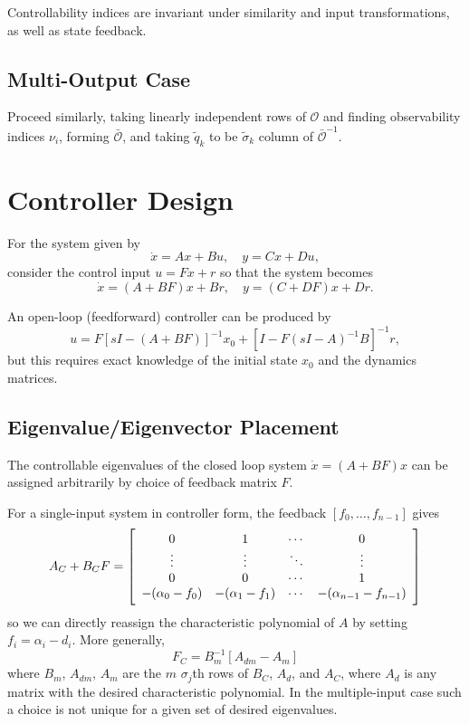 \documentclass{report}
\begin{document}
Controllability indices are invariant under similarity and input
transformations, as well as state feedback.

\subsection{Multi-Output Case}
Proceed similarly, taking linearly independent rows of $\mathcal{O}$
and finding observability indices $\nu_i$, forming $\bar{\mathcal{O}}$,
and taking $\tilde{q}_k$ to be
$\tilde{\sigma}_k$ column of $\bar{\mathcal{O}}^{-1}$.

\section{Controller Design}
For the system given by
$$
\dot{x} = Ax + Bu, \quad
y = Cx + Du,
$$
consider the control input $u = Fx + r$
so that the system becomes
$$
\dot{x} = (A + BF)x + Br, \quad
y = (C + DF) x + Dr.
$$

An open-loop (feedforward) controller can be produced by
$$
u = F[sI - (A + BF)]^{-1} x_0 + [I - F(sI - A)^{-1} B]^{-1} r,
$$
but this requires exact knowledge of the initial state $x_0$ and the
dynamics matrices.

\subsection{Eigenvalue/Eigenvector Placement}
The controllable eigenvalues of the closed loop system
$\dot{x} = (A + BF)x$ can be assigned arbitrarily by choice of
feedback matrix $F$.

For a single-input system in controller form, the feedback
$[f_0, \dots, f_{n-1}]$ gives
$$
A_C + B_C F =
\left[\begin{array}{c c c c}
   0                & 1                 & \cdots & 0      \\
   \vdots           & \vdots            & \ddots & \vdots \\
   0                & 0                 & \cdots & 1      \\
  -(\alpha_0 - f_0) &  -(\alpha_1 - f_1) & \cdots & -(\alpha_{n-1} - f_{n-1})
\end{array}\right]
$$
so we can directly reassign the characteristic polynomial of $A$ by
setting $f_i = \alpha_i - d_i$.
More generally,
$$
F_C = B_m^{-1} [ A_{dm} - A_m ]
$$
where $B_m$, $A_{dm}$, $A_m$ are the $m$ $\sigma_j$th rows of $B_C$,
$A_d$, and $A_C$, where $A_d$ is any matrix with the desired
characteristic polynomial. In the multiple-input case such a choice is
not unique for a given set of desired eigenvalues.
\end{document}
